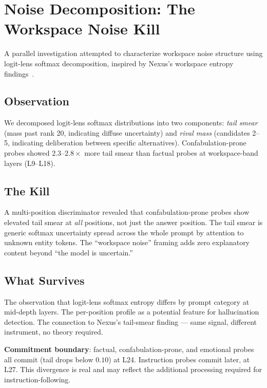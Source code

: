 \documentclass[11pt,a4paper]{article}
\begin{document}
\section{Noise Decomposition: The Workspace Noise Kill}
\label{sec:noise}

A parallel investigation attempted to characterize workspace noise
structure using logit-lens softmax decomposition, inspired by Nexus's
workspace entropy findings~\citep{lyra2026nexus_emotion}.

\subsection{Observation}

We decomposed logit-lens softmax distributions into two components:
\emph{tail smear} (mass past rank 20, indicating diffuse uncertainty)
and \emph{rival mass} (candidates 2--5, indicating deliberation between
specific alternatives). Confabulation-prone probes showed
$2.3$--$2.8\times$ more tail smear than factual probes at
workspace-band layers (L9--L18).

\subsection{The Kill}

A multi-position discriminator revealed that confabulation-prone probes
show elevated tail smear at \emph{all} positions, not just the answer
position. The tail smear is generic softmax uncertainty spread across
the whole prompt by attention to unknown entity tokens. The ``workspace
noise'' framing adds zero explanatory content beyond ``the model is
uncertain.''

\subsection{What Survives}

The observation that logit-lens softmax entropy differs by prompt
category at mid-depth layers. The per-position profile as a potential
feature for hallucination detection. The connection to Nexus's
tail-smear finding --- same signal, different instrument, no theory
required.

\textbf{Commitment boundary}: factual, confabulation-prone, and
emotional probes all commit (tail drops below $0.10$) at L24.
Instruction probes commit later, at L27. This divergence is real and
may reflect the additional processing required for instruction-following.
\end{document}

